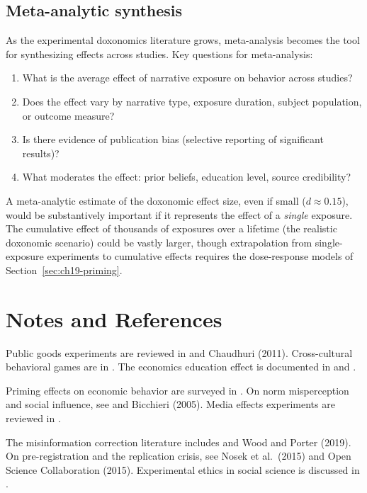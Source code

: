 \subsection{Meta-analytic synthesis}

As the experimental doxonomics literature grows, meta-analysis becomes the tool for synthesizing effects across studies.
Key questions for meta-analysis:
\begin{enumerate}[nosep]
  \item What is the average effect of narrative exposure on behavior across studies?
  \item Does the effect vary by narrative type, exposure duration, subject population, or outcome measure?
  \item Is there evidence of publication bias (selective reporting of significant results)?
  \item What moderates the effect: prior beliefs, education level, source credibility?
\end{enumerate}

A meta-analytic estimate of the doxonomic effect size, even if small ($d \approx 0.15$), would be substantively important if it represents the effect of a \emph{single} exposure.
The cumulative effect of thousands of exposures over a lifetime (the realistic doxonomic scenario) could be vastly larger, though extrapolation from single-exposure experiments to cumulative effects requires the dose-response models of Section~\ref{sec:ch19-priming}.

\section{Notes and References}
\label{sec:ch19-notes}

Public goods experiments are reviewed in \textcite{fischbacher2001} and Chaudhuri (2011).
Cross-cultural behavioral games are in \textcite{henrich2001}.
The economics education effect is documented in \textcite{frank1993} and \textcite{bauman1996}.

Priming effects on economic behavior are surveyed in \textcite{kahneman2011}.
On norm misperception and social influence, see \textcite{cialdini2006} and Bicchieri (2005).
Media effects experiments are reviewed in \textcite{dellavigna2010}.

The misinformation correction literature includes \textcite{nyhan2010} and Wood and Porter (2019).
On pre-registration and the replication crisis, see Nosek et al.\ (2015) and Open Science Collaboration (2015).
Experimental ethics in social science is discussed in \textcite{salganik2018}.


